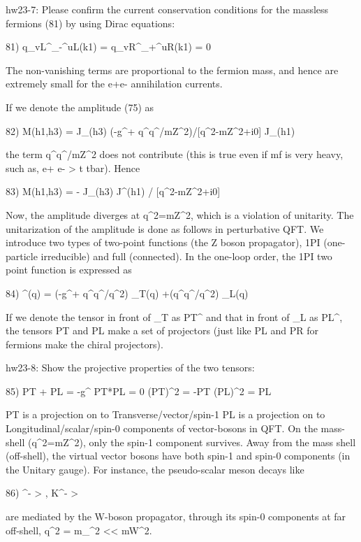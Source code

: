 \documentclass[12pt]{article}
\begin{document}
hw23-7: Please confirm the current conservation conditions for the
  massless fermions (81) by using Dirac equations:

  81) q_\mu vL^\dagger \sigma_-^\mu uL(k1)
    = q_\mu vR^\dagger \sigma_+^\mu uR(k1)
    = 0

  The non-vanishing terms are proportional to the fermion mass,
  and hence are extremely small for the e+e- annihilation currents.

  If we denote the amplitude (75) as

  82)  M(h1,h3) = J_\mu(h3)
                  (-g^\mu\nu + q^\mu q^\nu/mZ^2)/[q^2-mZ^2+i0]
                  J_\nu(h1)

  the term q^\mu q^\nu/mZ^2 does not contribute (this is true even if
  mf is very heavy, such as, e+ e- > t tbar).  Hence

  83) M(h1,h3) = - J_\mu(h3) J^\mu(h1) / [q^2-mZ^2+i0]

  Now, the amplitude diverges at q^2=mZ^2, which is a violation of
  unitarity.  The unitarization of the amplitude is done as follows
  in perturbative QFT.  We introduce two types of two-point functions
  (the Z boson propagator), 1PI (one-particle irreducible) and full
  (connected).  In the one-loop order, the 1PI two point function is
  expressed as

  84) \Pi^\mu\nu(q) = (-g^\mu\nu + q^\mu q^\nu/q^2) \Pi_T(q)
                                 +(q^\mu q^\nu/q^2) \Pi_L(q)

  If we denote the tensor in front of \Pi_T as PT^\mu\nu
  and that in front of \Pi_L as PL^\mu\nu, the tensors PT
  and PL make a set of projectors (just like PL and PR for
  fermions make the chiral projectors).

hw23-8: Show the projective properties of the two tensors:

  85) PT + PL = -g^\mu\nu
        PT*PL = 0
       (PT)^2 = -PT
       (PL)^2 =  PL

  PT is a projection on to Transverse/vector/spin-1
  PL is a projection on to Longitudinal/scalar/spin-0
  components of vector-bosons in QFT.  On the mass-shell (q^2=mZ^2),
  only the spin-1 component survives.  Away from the mass shell
  (off-shell), the virtual vector bosons have both spin-1 and spin-0
  components (in the Unitary gauge).  For instance, the pseudo-scalar
  meson decays like

  86) \pi^- > \mu \numubar, K^- > \mu \nubar

  are mediated by the W-boson propagator, through its spin-0 components
  at far off-shell, q^2 = m_\pi^2 << mW^2.
\end{document}
